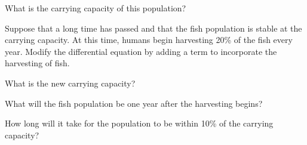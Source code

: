 \begin{exercises}
    \ba
    \item What is the carrying capacity of this population?

    \item Suppose that a long time has passed and that the fish
      population is stable at the carrying capacity.  At this time,
      humans begin harvesting 20\% of the fish every year.  Modify the
      differential equation by adding a term to incorporate the
      harvesting of fish.

    \item What is the new carrying capacity?

    \item What will the fish population be one year after the
      harvesting begins?

    \item How long will it take for the population to be within 10\%
      of the carrying capacity?
    \ea

\end{exercises}
\afterexercises


